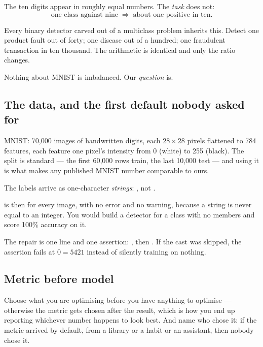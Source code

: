 \documentclass[11pt,a4paper]{article}
\begin{document}
The ten digits appear in roughly equal numbers. The \emph{task} does not:
\[ \text{one class against nine} \;\Longrightarrow\;
   \text{about one positive in ten}. \]

\begin{keybox}[title={This is not a fact about MNIST}]
Every binary detector carved out of a multiclass problem inherits this. Detect
one product fault out of forty; one disease out of a hundred; one fraudulent
transaction in ten thousand. The arithmetic is identical and only the ratio
changes.

Nothing about MNIST is imbalanced. Our \emph{question} is.
\end{keybox}

\subsection{The data, and the first default nobody asked for}

MNIST: 70{,}000 images of handwritten digits, each $28\times28$ pixels
flattened to 784 features, each feature one pixel's intensity from 0 (white) to
255 (black). The split is standard --- the first 60{,}000 rows train, the last
10{,}000 test --- and using it is what makes any published MNIST number
comparable to ours.

The labels arrive as one-character \emph{strings}: , not .

\begin{failbox}[title={Failure condition --- what forgetting the cast costs}]
 is then  for every image, with no error and no
warning, because a string is never equal to an integer. You would build a
detector for a class with no members and score 100\% accuracy on it.

The repair is one line and one assertion:
, then
. If the cast was skipped, the assertion
fails at $0 = 5421$ instead of silently training on nothing.
\end{failbox}

\subsection{Metric before model}

Choose what you are optimising before you have anything to optimise ---
otherwise the metric gets chosen after the result, which is how you end up
reporting whichever number happens to look best. And name who chose it: if the
metric arrived by default, from a library or a habit or an assistant, then
nobody chose it.
\end{document}
